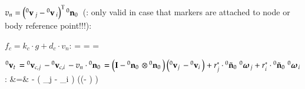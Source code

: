   \item $v_n = \left( \prescript{0}{}{\mathbf{v}}\,_j - \prescript{0}{}{\mathbf{v}}\,_i \right)^\mathrm{T} \prescript{0}{}{\mathbf{n}_0}\,$ (: only valid in case that markers are attached to node or body reference point!!!):
  \be
  \ee
  \be
  \ee
  \item $f_c = k_c \cdot g + d_c \cdot v_n$:
  \be
     = 
     = 
  \ee
  \be
     = 
  \ee
\item $\prescript{0}{}{\mathbf{v}_t}\, = \prescript{0}{}{\mathbf{v}_{c,j}}\, - \prescript{0}{}{\mathbf{v}_{c,i}}\, - v_n \cdot \prescript{0}{}{\mathbf{n}_0}\,=
\left( \mathbf{I} - \prescript{0}{}{\mathbf{n}_0}\, \otimes \prescript{0}{}{\mathbf{n}_0}\,\right) \left( \prescript{0}{}{\mathbf{v}_j}\, -\prescript{0}{}{\mathbf{v}_i}\, \right) 
        + r_j^* \cdot \prescript{0}{}{\tilde {\mathbf{n}}_0}\, \prescript{0}{}{\mbox{\boldmath $\omega$ \unboldmath}\!\!}\,_{j} 
        + r_i^* \cdot \prescript{0}{}{\tilde {\mathbf{n}}_0}\, \prescript{0}{}{\mbox{\boldmath $\omega$ \unboldmath}\!\!}\,_{i}$:
  \bea
     &=& 
    - \otimes \left( _j - _i \right) \left(\left(\Im - \otimes {} \right)         \right) \nonumber\\
